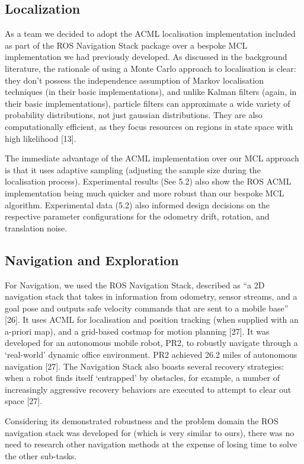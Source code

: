 \documentclass{article}
\begin{document}
\begin{multicols}{2}
	\subsection{Localization}
	As a team we decided to adopt the ACML localisation implementation included as part of the ROS Navigation Stack package over a bespoke MCL implementation we had previously developed. As discussed in the background literature, the rationale of using a Monte Carlo approach to localisation is clear: they don’t possess the independence assumption of Markov localisation techniques (in their basic implementations), and unlike Kalman filters (again, in their basic implementations), particle filters can approximate a wide variety of probability distributions, not just gaussian distributions. They are also computationally efficient, as they focus resources on regions in state space with high likelihood [13]. 

The immediate advantage of the ACML implementation over our MCL approach is that it uses adaptive sampling (adjusting the sample size during the localisation process). Experimental results (See 5.2) also show the ROS ACML implementation being much quicker and more robust than our bespoke MCL algorithm. Experimental data (5.2) also informed design decisions on the respective parameter configurations for the odometry drift, rotation, and translation noise.

	\subsection{Navigation and Exploration}
	For Navigation, we used the ROS Navigation Stack,  described as “a 2D navigation stack that takes in information from odometry, sensor streams, and a goal pose and outputs safe velocity commands that are sent to a mobile base” [26].  It uses ACML for localisation and position tracking (when supplied with an a-priori map), and a grid-based costmap for motion planning [27]. It was developed for an autonomous mobile robot, PR2, to robustly navigate through a ‘real-world’ dynamic office environment. PR2 achieved 26.2 miles of autonomous navigation [27].  The Navigation Stack also boasts several recovery strategies: when a robot finds itself ‘entrapped’ by obstacles, for example, a number of increasingly aggressive recovery behaviors are executed to attempt to clear out space [27]. 

Considering its demonstrated robustness and the problem domain the ROS navigation stack was developed for (which is very similar to ours), there was no need to research other navigation methods at the expense of losing time to solve the other sub-tasks.


\end{multicols}
\end{document}
